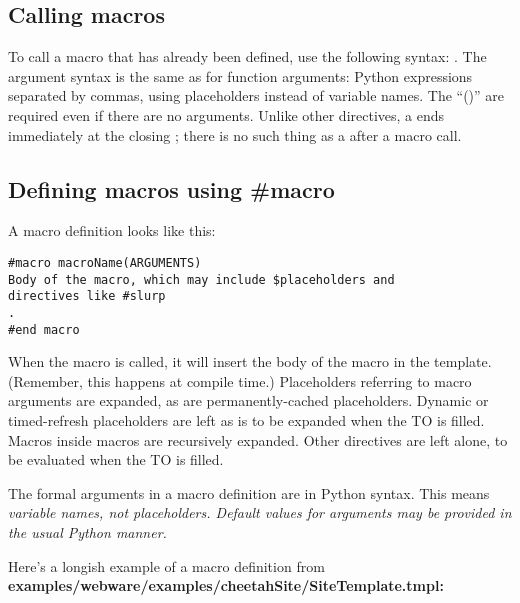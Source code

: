 \subsection{Calling macros}
\label{macros.calling}

To call a macro that has already been defined, use the following syntax:
.  The argument syntax is the same as for function
arguments: Python expressions separated by commas, using placeholders instead
of variable names.  The ``()'' are required even if there are no arguments.
Unlike other directives, a  ends immediately at the closing \code{()};
there is no such thing as a \code{\/\#} after a macro call.


\subsection{Defining macros using \#macro}
\label{macros.definingMacros}

A macro definition looks like this:

\begin{verbatim}
#macro macroName(ARGUMENTS)
Body of the macro, which may include $placeholders and
directives like #slurp
.
#end macro
\end{verbatim}

When the macro is called, it will insert the body of the macro in the 
template.  (Remember, this happens at compile time.)  Placeholders referring to
macro arguments are expanded, as are permanently-cached placeholders.
Dynamic or timed-refresh placeholders are left as is to be expanded when the TO
is filled.  Macros inside macros are recursively expanded.  Other directives 
are left alone, to be evaluated when the TO is filled.

The formal arguments in a macro definition are in Python syntax.  This means
\em{variable names}, not placeholders.  Default values for arguments may be
provided in the usual Python manner.

Here's a longish example of a macro definition from 
\bf{examples/webware/examples/cheetahSite/SiteTemplate.tmpl}:

